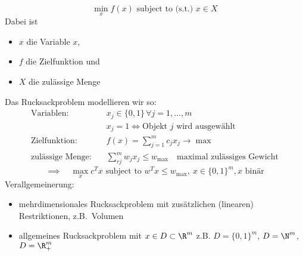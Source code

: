 \begin{definition} \label{def:allgemeines_optimierungsproblem}
  \begin{equation*}
    \min_{x} f(x) \text{ subject to (s.t.) } x \in X
  \end{equation*}
  Dabei ist
  \begin{itemize}
    \item $x$ die Variable $x$,
    \item $f$ die Zielfunktion und
    \item $X$ die zulässige Menge
  \end{itemize}
\end{definition}
Das Rucksackproblem modellieren wir so:
\begin{align*}
\text{Variablen}:\quad & x_{j} \in \{0,1\}\, \forall j =1, \dots, m\\
				 & x_{j}=1 \iff \text{Objekt $j$ wird ausgewählt}\\
\text{Zielfunktion}:\quad& f(x)= \sum_{j=1}^{m} c_j x_{j}\rightarrow \max\\
\text{zulässige Menge}:\quad & \sum_{rj}^{m} w_j x_j \leq w_{\max}\quad \text{maximal zulässiges Gewicht}
\end{align*}
\begin{equation*}
	\implies \quad \max_{x}c^Tx \text{ subject to } w^Tx \leq w_{\max},\ x \in \{0,1\}^m, x \text{ binär}
\end{equation*}
Verallgemeinerung:
\begin{itemize}
	\item mehrdimensionales Rucksackproblem mit zusätzlichen (linearen) Restriktionen, z.B.\ Volumen
  \item allgemeines Rucksackproblem mit $x\in D\subset \R^m$ z.B. $D=\{0,1\}^m$, $D=\N^m$, $D = \R_{+}^m$
\end{itemize}

